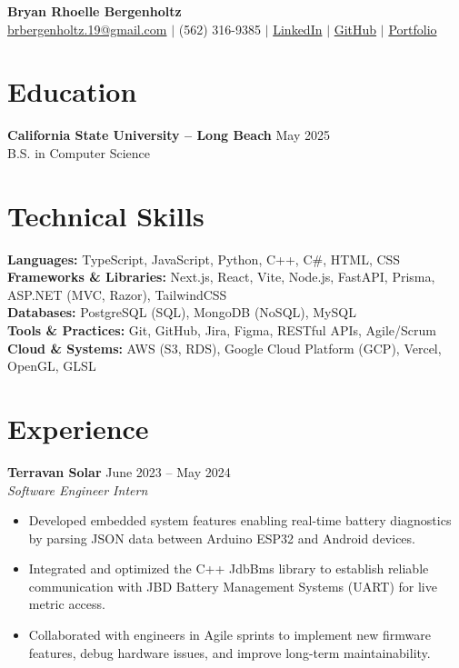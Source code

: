 \documentclass[a4paper,9.5pt]{article}
\newcommand{\dateright}[1]{\hfill {\small\textnormal{#1}}}
\begin{document}

\begin{center}
  {\LARGE \textbf{Bryan Rhoelle Bergenholtz}}\\[-1pt]
  \href{mailto:brbergenholtz.19@gmail.com}{brbergenholtz.19@gmail.com} $|$
  (562) 316-9385 $|$
  \href{https://linkedin.com/in/bryanbergenholtz}{LinkedIn} $|$
  \href{https://github.com/YanRho}{GitHub} $|$
  \href{https://yanrho.vercel.app}{Portfolio}
\end{center}

\section*{Education}
\textbf{California State University – Long Beach} \dateright{May 2025}\\
B.S. in Computer Science

\section*{Technical Skills}
\textbf{Languages:} TypeScript, JavaScript, Python, C++, C\#, HTML, CSS \\
\textbf{Frameworks \& Libraries:} Next.js, React, Vite, Node.js, FastAPI, Prisma, ASP.NET (MVC, Razor), TailwindCSS \\
\textbf{Databases:} PostgreSQL (SQL), MongoDB (NoSQL), MySQL \\
\textbf{Tools \& Practices:} Git, GitHub, Jira, Figma, RESTful APIs, Agile/Scrum \\
\textbf{Cloud \& Systems:} AWS (S3, RDS), Google Cloud Platform (GCP), Vercel, OpenGL, GLSL


\section*{Experience}
\textbf{Terravan Solar} \dateright{June 2023 – May 2024}\\
\textit{Software Engineer Intern}
\begin{itemize}
  \item Developed embedded system features enabling real-time battery diagnostics by parsing JSON data between Arduino ESP32 and Android devices.
  \item Integrated and optimized the C++ JdbBms library to establish reliable communication with JBD Battery Management Systems (UART) for live metric access.
  \item Collaborated with engineers in Agile sprints to implement new firmware features, debug hardware issues, and improve long-term maintainability.
\end{itemize}
\end{document}
